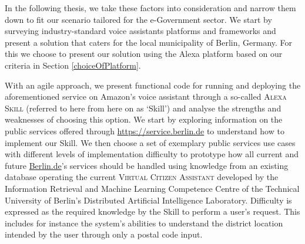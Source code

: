 In the following thesis, we take these factors into consideration and narrow them down to fit our scenario tailored for the e-Government sector. We start by surveying industry-standard %
voice assistants platforms 
and frameworks
and present a solution that caters for the local municipality of Berlin, Germany. For this we choose to present our solution using the Alexa platform based on our criteria in Section \ref{choiceOfPlatform}.

With an agile approach, we present functional code for running and deploying the aforementioned service on Amazon's voice assistant through a so-called \textsc{Alexa Skill} (referred to here from here on as `Skill') and analyse the strengths and weaknesses of choosing this option. We start by exploring information on the public services offered through \href{https://service.berlin.de}{https://service.berlin.de} 
to understand how to implement our Skill. 
We then choose a set of exemplary public services use cases with different levels of implementation difficulty to prototype how all current and future \href{https://service.berlin.de}{Berlin.de}'s 
services should be handled using knowledge from an existing database operating the current \textsc{Virtual Citizen Assistant} developed by the Information Retrieval and Machine Learning Competence Centre of the Technical University of Berlin's Distributed Artificial Intelligence Laboratory.
Difficulty is expressed as the required knowledge by the Skill to perform a user's request. This includes for instance the system's abilities to understand the district location intended by the user through only a postal code input.

